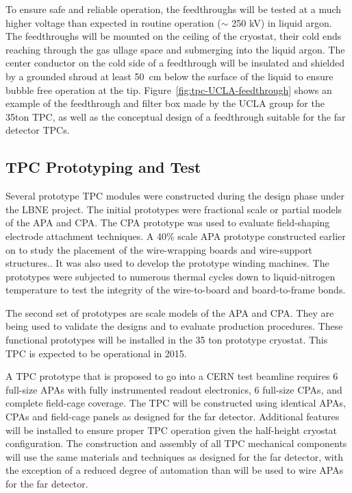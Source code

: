 To ensure safe and reliable operation, the feedthroughs will be tested at a much higher voltage than expected in
routine operation ($\sim$ 250 kV) in liquid argon. The feedthroughs will be mounted on the ceiling of the cryostat, their cold ends reaching 
through the gas ullage space and submerging into the liquid argon. The center conductor on the cold side of a feedthrough will be 
insulated and shielded by a grounded shroud at least 50~cm below the 
surface of the liquid to ensure bubble free operation at the tip. Figure~\ref{fig:tpc-UCLA-feedthrough} shows an example 
of the feedthrough and filter box made by the UCLA group for the 35ton TPC, as well as the conceptual design of a feedthrough suitable for the far detector TPCs.


\subsection{TPC Prototyping and Test}
\label{subsec:fd-ref-tpc-proto}


Several prototype TPC modules were constructed during the design phase under the LBNE project. The initial prototypes were fractional scale or partial models of the APA and CPA. The CPA prototype was used to evaluate field-shaping electrode attachment techniques. A 40\% scale APA prototype constructed earlier on to study the placement of the wire-wrapping boards and wire-support structures.. It was also used to develop the prototype winding machines. The prototypes were subjected to numerous thermal cycles down to liquid-nitrogen temperature to test the integrity of the wire-to-board and board-to-frame bonds. 

The second set of prototypes are scale models of the APA and CPA. They are being used to validate the designs and to evaluate production procedures. These functional prototypes will be installed in the 35 ton prototype cryostat. This TPC is expected to be operational in 2015.

A TPC prototype that is proposed to go into a CERN test beamline requires 6 full-size APAs with fully instrumented readout electronics, 6 full-size CPAs, and complete field-cage coverage. The TPC will be constructed using identical APAs, CPAs and field-cage panels as designed for the far detector. Additional features will be installed to ensure proper TPC operation given the half-height cryostat configuration. The construction and assembly of all TPC mechanical components will use the same materials and techniques as designed for the far detector, with the exception of a reduced degree of automation than will be used to wire APAs for the far detector. 





